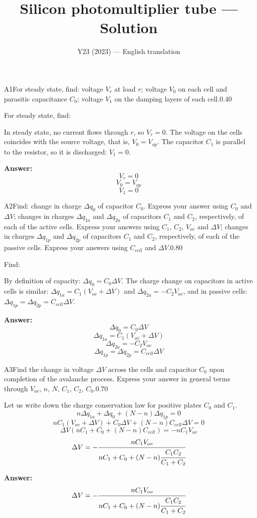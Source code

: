 \documentclass[11pt,a4paper]{article}
\title{\textbf{Silicon photomultiplier tube --- Solution}}
\author{\normalsize Y23 (2023) — English translation}
\date{}
\begin{document}
\maketitle\vspace{-0.5em}
\begin{solcard}{A1}{For steady state, find: voltage $V_r$ at load $r$; voltage $V_0$ on each cell and parasitic capacitance $C_0$; voltage $V_1$ on the damping layers of each cell.}{0.40}

For steady state, find:


In steady state, no current flows through $r$, so $V_r = 0$. The voltage on the cells coincides with the source voltage, that is, $V_0 = V_{op}$. The capacitor $C_1$ is parallel to the resistor, so it is discharged: $V_1 = 0$.

\par\smallskip\noindent\textbf{Answer:} $$V_r = 0$$$$V_0 = V_{op}$$$$V_1 = 0$$
\end{solcard}

\begin{solcard}{A2}{Find: change in charge $\Delta{q}_0$ of capacitor $C_0$. Express your answer using $C_0$ and $\Delta{V}$; changes in charges $\Delta{q}_{1a}$ and $\Delta{q}_{2a}$ of capacitors $C_1$ and $C_2$, respectively, of each of the active cells. Express your answers using $C_1$, $C_2$, $V_{ov}$ and $\Delta{V}$; changes in charges $\Delta{q}_{1p}$ and $\Delta{q}_{2p}$ of capacitors $C_1$ and $C_2$, respectively, of each of the passive cells. Express your answers using $C_{cell}$ and $\Delta{V}$.}{0.80}

Find:


By definition of capacity: $\Delta q_0 = C_0\Delta V$. The charge change on capacitors in active cells is similar: $\Delta q_{1a} = C_1(V_{ov} + \Delta V)$ and $\Delta q_{2a} = -C_2 V_{ov}$, and in passive cells: $\Delta q_{1p} = \Delta q_{2p} = C_{cell} \Delta V$.

\par\smallskip\noindent\textbf{Answer:} $$\Delta q_0 = C_0\Delta V$$$$\Delta q_{1a} = C_1(V_{ov} + \Delta V)$$$$\Delta q_{2a} = -C_2 V_{ov}$$$$\Delta q_{1p} = \Delta q_{2p} = C_{cell} \Delta V$$
\end{solcard}

\begin{solcard}{A3}{Find the change in voltage $\Delta{V}$ across the cells and capacitor $C_0$ upon completion of the avalanche process. Express your answer in general terms through $V_{ov}$, $n$, $N$, $C_1$, $C_2$, $C_0$.}{0.70}

Let us write down the charge conservation law for positive plates $C_0$ and $C_1$. $$n\Delta q_{1a} + \Delta q_0 + (N-n)\Delta q_{1p} = 0$$$$n C_1(V_{ov} + \Delta V) + C_0\Delta V + (N-n)C_{cell} \Delta V = 0$$$$\Delta V (nC_1 + C_0 + (N-n)C_{cell}) = - nC_1 V_{ov}$$$$\Delta V = -\cfrac{ nC_1 V_{ov}}{nC_1 + C_0 + (N-n)\cfrac{C_1 C_2}{C_1 + C_2}}$$

\par\smallskip\noindent\textbf{Answer:} $$\Delta V = -\cfrac{ nC_1 V_{ov}}{nC_1 + C_0 + (N-n)\cfrac{C_1 C_2}{C_1 + C_2}}$$
\end{solcard}
\end{document}
